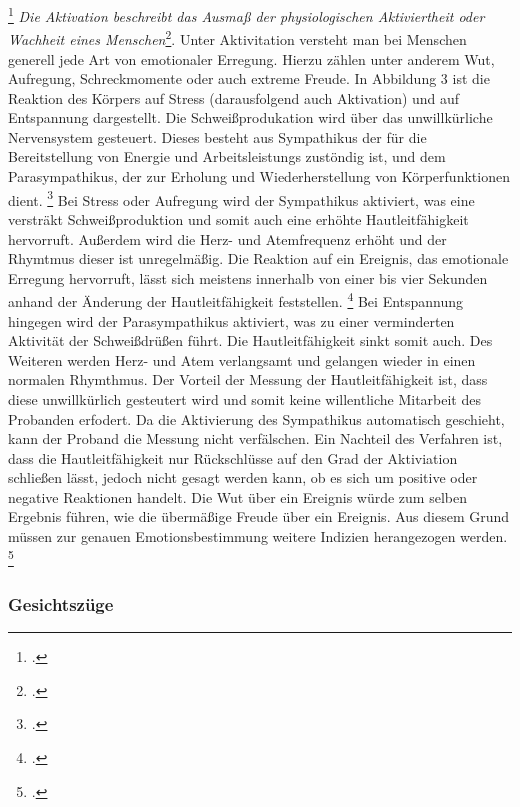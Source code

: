 \footcitetext[][S. 200]{Dil13}
\newline
\glqq \textit{Die Aktivation beschreibt das Ausmaß der physiologischen Aktiviertheit oder Wachheit eines Menschen}\grqq{}\footcite[][S. 28]{Die06}. Unter Aktivitation versteht man bei Menschen generell jede Art von emotionaler Erregung. Hierzu zählen unter anderem Wut, Aufregung, Schreckmomente oder auch extreme Freude. In Abbildung 3 ist die Reaktion des Körpers auf Stress (darausfolgend auch Aktivation) und auf Entspannung dargestellt. Die Schweißprodukation wird über das unwillkürliche Nervensystem gesteuert. Dieses besteht aus Sympathikus der für die Bereitstellung von Energie und Arbeitsleistungs zustöndig ist, und dem Parasympathikus, der zur Erholung und Wiederherstellung von Körperfunktionen dient. \footcite[Vgl. ][S. 5]{Lie13} \newline Bei Stress oder Aufregung wird der Sympathikus aktiviert, was eine versträkt Schweißproduktion und somit auch eine erhöhte Hautleitfähigkeit hervorruft. Außerdem wird die Herz- und Atemfrequenz erhöht und der Rhymtmus dieser ist unregelmäßig. Die Reaktion auf ein Ereignis, das emotionale Erregung hervorruft, lässt sich meistens innerhalb von einer bis vier Sekunden anhand der Änderung der Hautleitfähigkeit feststellen. \footcite[Vgl.][S. 130f]{Sch14} \newline 
Bei Entspannung hingegen wird der Parasympathikus aktiviert, was zu einer verminderten Aktivität der Schweißdrüßen führt. Die Hautleitfähigkeit sinkt somit auch. Des Weiteren werden Herz- und Atem verlangsamt und gelangen wieder in einen normalen Rhymthmus. \newline
Der Vorteil der Messung der Hautleitfähigkeit ist, dass diese unwillkürlich gesteutert wird und somit keine willentliche Mitarbeit des Probanden erfodert. Da die Aktivierung des Sympathikus automatisch geschieht, kann der Proband die Messung nicht verfälschen. \newline
Ein Nachteil des Verfahren ist, dass die Hautleitfähigkeit nur Rückschlüsse auf den Grad der Aktiviation schließen lässt, jedoch nicht gesagt werden kann, ob es sich um positive oder negative Reaktionen handelt. Die Wut über ein Ereignis würde zum selben Ergebnis führen, wie die übermäßige Freude über ein Ereignis. Aus diesem Grund müssen zur genauen Emotionsbestimmung weitere Indizien herangezogen werden. \footcite[Vgl. ][S.77]{Moe07}

\subsubsection{Gesichtszüge}
